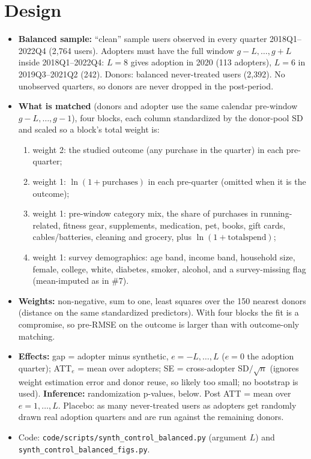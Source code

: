 \documentclass[11pt]{article}
\begin{document}
\section{Design}\label{sec:design}
\begin{itemize}[nosep]
\item \textbf{Balanced sample:} ``clean'' sample users observed in every quarter 2018Q1--2022Q4 (2{,}764 users). Adopters must have the full window $g-L,\dots,g+L$ inside 2018Q1--2022Q4: $L=8$ gives adoption in 2020 (113 adopters), $L=6$ in 2019Q3--2021Q2 (242). Donors: balanced never-treated users (2{,}392). No unobserved quarters, so donors are never dropped in the post-period.
\item \textbf{What is matched} (donors and adopter use the same calendar pre-window $g-L,\dots,g-1$), four blocks, each column standardized by the donor-pool SD and scaled so a block's total weight is:
\begin{enumerate}[nosep]
\item weight 2: the studied outcome (any purchase in the quarter) in each pre-quarter;
\item weight 1: $\ln(1+\mathrm{purchases})$ in each pre-quarter (omitted when it is the outcome);
\item weight 1: pre-window category mix, the share of purchases in running-related, fitness gear, supplements, medication, pet, books, gift cards, cables/batteries, cleaning and grocery, plus $\ln(1+\mathrm{total spend})$;
\item weight 1: survey demographics: age band, income band, household size, female, college, white, diabetes, smoker, alcohol, and a survey-missing flag (mean-imputed as in \#7).
\end{enumerate}
\item \textbf{Weights:} non-negative, sum to one, least squares over the 150 nearest donors (distance on the same standardized predictors). With four blocks the fit is a compromise, so pre-RMSE on the outcome is larger than with outcome-only matching.
\item \textbf{Effects:} gap = adopter minus synthetic, $e=-L,\dots,L$ ($e=0$ the adoption quarter); ATT$_e$ = mean over adopters; SE = cross-adopter SD$/\sqrt n$ (ignores weight estimation error and donor reuse, so likely too small; no bootstrap is used). \textbf{Inference:} randomization p-values, below. Post ATT = mean over $e=1,\dots,L$. Placebo: as many never-treated users as adopters get randomly drawn real adoption quarters and are run against the remaining donors.
\item Code: \texttt{code/scripts/synth\_control\_balanced.py} (argument $L$) and \texttt{synth\_control\_balanced\_figs.py}.
\end{itemize}
\end{document}
